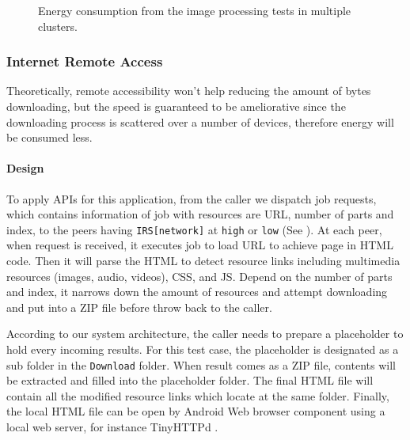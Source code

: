 \documentclass[conference]{IEEEtran}
\begin{document}
\begin{figure}[H]
	\hspace*{-0.35cm}
	\caption{Energy consumption from the image processing tests in multiple clusters.}
	\label{fig:small_img_energy}
\end{figure}


\subsubsection{Internet Remote Access} 
Theoretically, remote accessibility won't help reducing the amount of bytes downloading, but the speed is guaranteed to be ameliorative since the downloading process is scattered over a number of devices, therefore energy will be consumed less. 

\paragraph{Design}

To apply APIs for this application, from the caller we dispatch job requests, which contains information of job with resources are URL, number of parts and index, to the peers having \texttt{IRS[network]} at \texttt{high} or \texttt{low} (See ). At each peer, when request is received, it executes job to load URL to achieve page in HTML code. Then it will parse the HTML to detect resource links including multimedia resources (images, audio, videos), CSS, and JS. Depend on the number of parts and index, it narrows down the amount of resources and attempt downloading and put into a ZIP file before throw back to the caller.

According to our system architecture, the caller needs to prepare a placeholder to hold every incoming results. For this test case, the placeholder is designated as a sub folder in the \texttt{Download} folder. When result comes as a ZIP file, contents will be extracted and filled into the placeholder folder. The final HTML file will contain all the modified resource links which locate at the same folder. Finally, the local HTML file can be open by Android Web browser component using a local web server, for instance TinyHTTPd \cite{tinyhttpd}.
\end{document}
